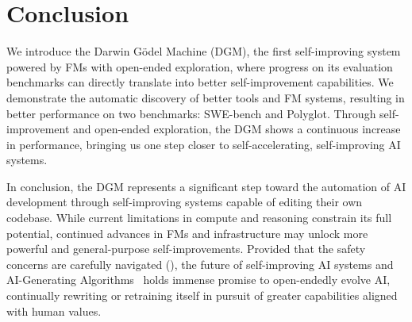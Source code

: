 \section{Conclusion}
\label{sec:conclusion}


We introduce the Darwin G\"odel Machine (DGM), the first self-improving system powered by FMs with open-ended exploration, where progress on its evaluation benchmarks can directly translate into better self-improvement capabilities. We demonstrate the automatic discovery of better tools and FM systems, resulting in better performance on two benchmarks: SWE-bench and Polyglot. Through self-improvement and open-ended exploration, the DGM shows a continuous increase in performance, bringing us one step closer to self-accelerating, self-improving AI systems.

In conclusion, the DGM represents a significant step toward the automation of AI development through self-improving systems capable of editing their own codebase. While current limitations in compute and reasoning constrain its full potential, continued advances in FMs and infrastructure may unlock more powerful and general-purpose self-improvements. Provided that the safety concerns are carefully navigated (), the future of self-improving AI systems and AI-Generating Algorithms~\citep{clune2019ai} holds immense promise to open-endedly evolve AI, continually rewriting or retraining itself in pursuit of greater capabilities aligned with human values.
